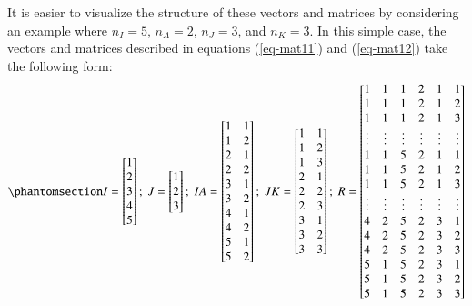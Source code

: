\documentclass[
  authoryear,
  review,
  1p]{elsarticle}
\begin{document}
It is easier to visualize the structure of these vectors and matrices by
considering an example where \(n_{I} = 5\), \(n_{A} = 2\),
\(n_{J} = 3\), and \(n_{K} = 3\). In this simple case, the vectors and
matrices described in equations (\ref{eq-mat11}) and (\ref{eq-mat12})
take the following form:
\begin{equation}\phantomsection\label{eq-mat13}{
I = \begin{bmatrix}
1 \\
2 \\
3 \\
4 \\
5 
\end{bmatrix} ; \;
J = \begin{bmatrix}
1 \\
2 \\
3 
\end{bmatrix} ; \;
IA = \begin{bmatrix}
1 & 1 \\
1 & 2 \\
2 & 1 \\
2 & 2 \\
3 & 1 \\
3 & 2 \\
4 & 1 \\
4 & 2 \\
5 & 1 \\
5 & 2 
\end{bmatrix} ; \;
JK = \begin{bmatrix}
1 & 1 \\
1 & 2 \\
1 & 3 \\
2 & 1 \\
2 & 2 \\
2 & 3 \\
3 & 1 \\
3 & 2 \\
3 & 3 
\end{bmatrix} ; \;
R = \begin{bmatrix}
1 & 1 & 1 & 2 & 1 & 1 \\
1 & 1 & 1 & 2 & 1 & 2 \\
1 & 1 & 1 & 2 & 1 & 3 \\
\vdots & \vdots & \vdots & \vdots & \vdots & \vdots\\
1 & 1 & 5 & 2 & 1 & 1 \\
1 & 1 & 5 & 2 & 1 & 2 \\
1 & 1 & 5 & 2 & 1 & 3 \\
\vdots & \vdots & \vdots & \vdots & \vdots & \vdots\\
4 & 2 & 5 & 2 & 3 & 1 \\
4 & 2 & 5 & 2 & 3 & 2 \\
4 & 2 & 5 & 2 & 3 & 3 \\
5 & 1 & 5 & 2 & 3 & 1 \\
5 & 1 & 5 & 2 & 3 & 2 \\
5 & 1 & 5 & 2 & 3 & 3 
\end{bmatrix}
}\end{equation}
\end{document}
